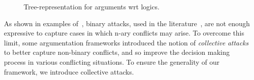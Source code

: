 \begin{figure}
\caption{
Tree-representation for arguments wrt logics.
}
\label{fig:propositional-DeLP-sequent}
\end{figure}










As shown in examples of~\cite{Yun2020SetsOA,Amgoud12,ArieliH24}, binary attacks, used in the literature~\cite{ArieliS19,ARIOUA201776,LoanHo2022,ZhangL13,Castagna21}, are not enough expressive to capture cases in which n-ary conflicts may arise.
To overcome this limit, some argumentation frameworks introduced the notion of \emph{collective attacks} to better capture non-binary conflicts, and so improve the decision making process in various conflicting situations. To ensure the generality of our framework, we introduce collective attacks.

